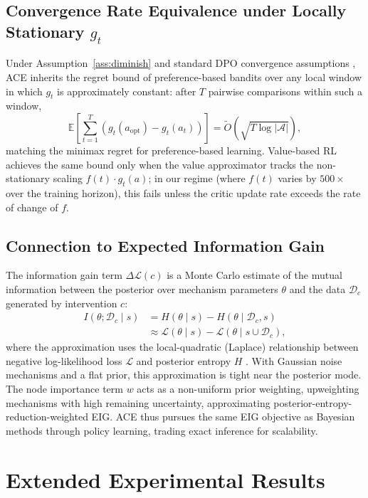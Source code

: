 \subsection{Convergence Rate Equivalence under Locally Stationary $g_t$}
\label{app:convergence}

Under Assumption~\ref{ass:diminish} and standard DPO convergence assumptions \citep{rafailov2023direct}, ACE inherits the regret bound of preference-based bandits over any local window in which $g_t$ is approximately constant: after $T$ pairwise comparisons within such a window,
\[\mathbb{E}\!\left[\sum_{t=1}^T (g_t(a_\text{opt}) - g_t(a_t))\right] = \tilde{O}(\sqrt{T \log |\mathcal{A}|}),\]
matching the minimax regret for preference-based learning. Value-based RL achieves the same bound only when the value approximator tracks the non-stationary scaling $f(t) \cdot g_t(a)$; in our regime (where $f(t)$ varies by $500\times$ over the training horizon), this fails unless the critic update rate exceeds the rate of change of $f$.

\subsection{Connection to Expected Information Gain}
\label{app:info-gain}

The information gain term $\Delta\mathcal{L}(c)$ is a Monte Carlo estimate of the mutual information between the posterior over mechanism parameters $\theta$ and the data $\mathcal{D}_c$ generated by intervention $c$:
\begin{align}
I(\theta; \mathcal{D}_c \mid s) &= H(\theta \mid s) - H(\theta \mid \mathcal{D}_c, s) \\
&\approx \mathcal{L}(\theta \mid s) - \mathcal{L}(\theta \mid s \cup \mathcal{D}_c),
\end{align}
where the approximation uses the local-quadratic (Laplace) relationship between negative log-likelihood loss $\mathcal{L}$ and posterior entropy $H$ \citep{rainforth2024modern}. With Gaussian noise mechanisms and a flat prior, this approximation is tight near the posterior mode. The node importance term $w$ acts as a non-uniform prior weighting, upweighting mechanisms with high remaining uncertainty, approximating posterior-entropy-reduction-weighted EIG. ACE thus pursues the same EIG objective as Bayesian methods through policy learning, trading exact inference for scalability.

\section{Extended Experimental Results}
\label{app:experiments}

